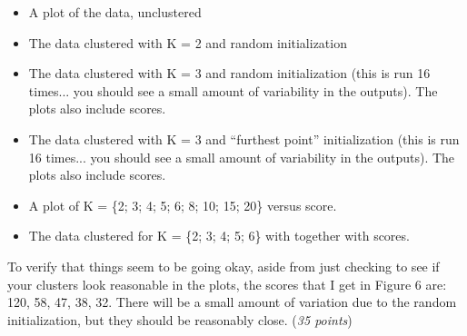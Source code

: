 \documentclass[fleqn]{article}
\begin{document}
\begin{itemize}
  \item A plot of the data, unclustered
  \item The data clustered with K = 2 and random initialization
  \item The data clustered with K = 3 and random initialization (this is run 
  16 times... you should see a small
  amount of variability in the outputs). The plots also include scores.
  \item The data clustered with K = 3 and ``furthest point'' initialization 
  (this is run 16 times... you should see a small amount of variability in the 
  outputs). The plots also include scores.
  \item A plot of K = \{2; 3; 4; 5; 6; 8; 10; 15; 20\} versus score.
  \item The data clustered for K = \{2; 3; 4; 5; 6\} with together with scores.
\end{itemize}

To verify that things seem to be going okay, aside from just checking to see if 
your clusters look reasonable in the plots, the scores that I get in Figure 6 are: 
120, 58, 47, 38, 32. There will be a small amount of variation due to the random 
initialization, but they should be reasonably close. (\textit{35 points})

\ene
\end{document}
